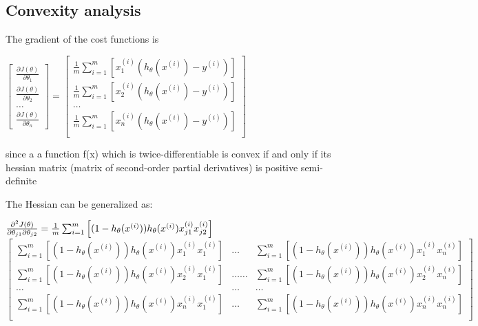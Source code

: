    
   
	\subsection{Convexity analysis}
	
	The gradient of the cost functions is
	
		\begin{center}
		$\left[ \begin{array}{c}
		\frac{\partial J(\theta)}{\partial \theta_1} \\[0.1in]	
		\frac{\partial J(\theta)}{\partial \theta_2} \\[0.1in]	
		\ldots \\[0.1in]	
		\frac{\partial J(\theta)}{\partial \theta_n}
		\end{array} \right] =
		\left[ \begin{array}{c}
		\frac{1}{m}\sum_{i=1}^{m}\left[x_1^{(i)}\left(h_\theta(x^{(i)})-y^{(i)}\right)\right]\\[0.1in]
				\frac{1}{m}\sum_{i=1}^{m}\left[x_2^{(i)}\left(h_\theta(x^{(i)})-y^{(i)}\right)\right]
		\\[0.1in]	
		\ldots \\[0.1in]	
		\frac{1}{m}\sum_{i=1}^{m}\left[x_n^{(i)}\left(h_\theta(x^{(i)})-y^{(i)}\right)\right]
		\\[0.1in]	
		\end{array} \right]$
	\end{center}
	
	since a a function f(x) which is twice-differentiable is convex if and only if its
	hessian matrix (matrix of second-order partial derivatives) is positive semi-definite

The Hessian can be generalized as: 
	\begin{center}
	 $\frac{\partial^2 J(\theta)}{\partial\theta_{j1}\partial\theta_{j2}}=\frac{1}{m}\sum_{i=1}^{m}
	\left[
	(1-h_\theta(x^{(i)}))h_\theta(x^{(i)})x_{j1}^{(i)}x_{j2}^{(i)}
	\right]
	$\\[0.2in]
	\[
	\left[ \begin{array}{ccc}
	\sum_{i=1}^{m}	\left[
	(1-h_\theta(x^{(i)}))h_\theta(x^{(i)})x_{1}^{(i)}x_{1}^{(i)}	\right] & \ldots & 
	\sum_{i=1}^{m}	\left[
	 (1-h_\theta(x^{(i)}))h_\theta(x^{(i)})x_{1}^{(i)}x_{n}^{(i)}	\right] \\[0.1in] 
	 \sum_{i=1}^{m}	\left[
	(1-h_\theta(x^{(i)}))h_\theta(x^{(i)})x_{2}^{(i)}x_{1}^{(i)}	\right]  & \ldots
	 \ldots & \sum_{i=1}^{m}	\left[
	(1-h_\theta(x^{(i)}))h_\theta(x^{(i)})x_{2}^{(i)}x_{n}^{(i)}	\right] \\ [0.1in]
	\ldots  & \ldots & \ldots \\ [0.1in]
	\sum_{i=1}^{m}	\left[
	(1-h_\theta(x^{(i)}))h_\theta(x^{(i)})x_{n}^{(i)}x_{1}^{(i)}	\right] & \ldots &
	\sum_{i=1}^{m}	\left[
	(1-h_\theta(x^{(i)}))h_\theta(x^{(i)})x_{n}^{(i)}x_{n}^{(i)}	\right] \\ [0.1in]
	\end{array} \right] 
	\]
	\end{center}
	
